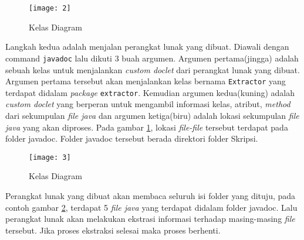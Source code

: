 \begin{figure}[H]
	\centering  
	\texttt{[image: 2]}  
	\caption[Kelas Diagram]{Kelas Diagram} 
	\label{fig:2} 
\end{figure}
Langkah kedua adalah menjalan perangkat lunak yang dibuat. Diawali dengan command \texttt{javadoc} lalu dikuti 3 buah argumen. Argumen pertama(jingga) adalah sebuah kelas untuk menjalankan {\it custom doclet} dari perangkat lunak yang dibuat. Argumen pertama tersebut akan menjalankan kelas bernama \texttt{Extractor} yang terdapat didalam {\it package} \texttt{extractor}. Kemudian argumen kedua(kuning) adalah {\it custom doclet} yang berperan untuk mengambil informasi kelas, atribut, {\it method} dari sekumpulan {\it file java} dan argumen ketiga(biru) adalah lokasi sekumpulan {\it file java} yang akan diproses. Pada gambar \ref{fig:2}, lokasi {\it file-file} tersebut terdapat pada folder javadoc. Folder javadoc tersebut berada direktori folder Skripsi.

\begin{figure}[H]
	\centering  
	\texttt{[image: 3]}  
	\caption[Kelas Diagram]{Kelas Diagram} 
	\label{fig:3} 
\end{figure}
Perangkat lunak yang dibuat akan membaca seluruh isi folder yang dituju, pada contoh gambar \ref{fig:3}, terdapat 5 {\it file java} yang terdapat didalam folder javadoc. Lalu perangkat lunak akan melakukan ekstrasi informasi terhadap masing-masing {\it file} tersebut. Jika proses ekstraksi selesai maka proses berhenti.
























